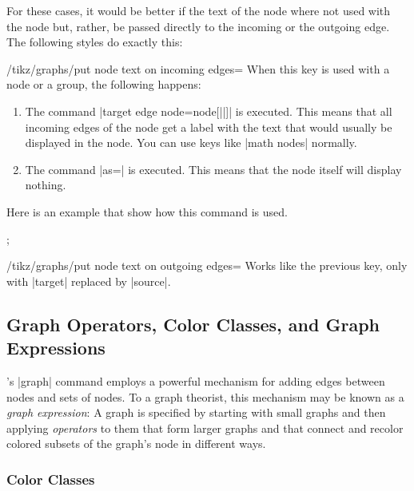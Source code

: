 For these cases, it would be better if the text of the node where not
used with the node but, rather, be passed directly to the incoming or
the outgoing edge. The following styles do exactly this:

\begin{key}{/tikz/graphs/put node text on incoming edges=}
  When this key is used with a node or a group, the following happens:
  \begin{enumerate}
  \item The command |target edge node={node[||]{\tikzgraphnodetext}}|
    is executed. This means that all incoming edges of the node get a
    label with the text that would usually be displayed in the
    node. You can use keys like |math nodes| normally.
  \item The command |as={}| is executed. This means that the node
    itself will display nothing.
  \end{enumerate}
  Here is an example that show how this command is used.
\begin{codeexample}[]
\tikz {};
\end{codeexample}
\end{key}

\begin{key}{/tikz/graphs/put node text on outgoing
    edges=}
  Works like the previous key, only with |target| replaced by |source|.  
\end{key}



\subsection{Graph Operators, Color Classes, and Graph Expressions}
\label{section-library-graphs-color-classes}

\tikzname's |graph| command employs a powerful mechanism for
adding edges between nodes and sets of nodes. To a graph theorist,
this mechanism may be known as a \emph{graph expression}: A graph is
specified by starting with small graphs and then applying
\emph{operators} to them that form larger graphs and that connect and
recolor colored subsets of the graph's node in different ways. 


\subsubsection{Color Classes}

